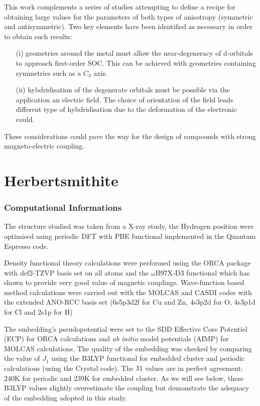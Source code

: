 \documentclass[10pt]{report}
\numberwithin{equation}{section}
\begin{document}
\par This work complements a series of studies attempting to define a recipe for obtaining large values for the parameters of both types of anisotropy (symmetric and antisymmetric).
Two key elements have been identified as necessary in order to obtain such results:
\begin{itemize}
    \item[(i)] geometries around the metal must allow the near-degeneracy of d-orbitals to approach first-order SOC. This can be achieved with geometries containing symmetries such as a $C_3$ axis.
    \item[(ii)] hybdridisation of the degenerate orbitals must be possible via the application an electric field. The choice of orientation of the field leads different type of hybdridisation due to the deformation of the electronic could. 
\end{itemize}
These considerations could pave the way for the design of compounds with strong magneto-electric coupling.


\chapter{Herbertsmithite}


\subsection*{Computational Informations}

The structure studied was taken from a X-ray study, the Hydrogen position were optimised using periodic DFT with PBE functional implemented in the Quantum Espresso code.

Density functional theory calculations were performed using the ORCA package with def2-TZVP basis set on all atoms and the $\omega$B97X-D3 functional which has shown to provide very good value of magnetic couplings.
Wave-function based method calculations were carried out with the MOLCAS and CASDI codes with the extended ANO-RCC basis set (6s5p3d2f for Cu and Zn, 4s3p2d
for O, 4s3p1d for Cl and 2s1p for H)

The embedding's pseudopotential were set to the SDD Effective Core Potentiel (ECP) for ORCA calculations and \textit{ab} \textit{initio} model potentials (AIMP) for MOLCAS calculations. 
The quality of the embedding was checked by comparing the value of $J_1$ using the B3LYP functional for embedded cluster and periodic calculations (using the Crystal code). 
The J1 values are in perfect agreement: 240K for periodic and 239K for embedded cluster. 
As we will see below, these B3LYP values slightly overestimate the coupling but demonstrate the adequacy of the embedding adopted in this study.
\end{document}
